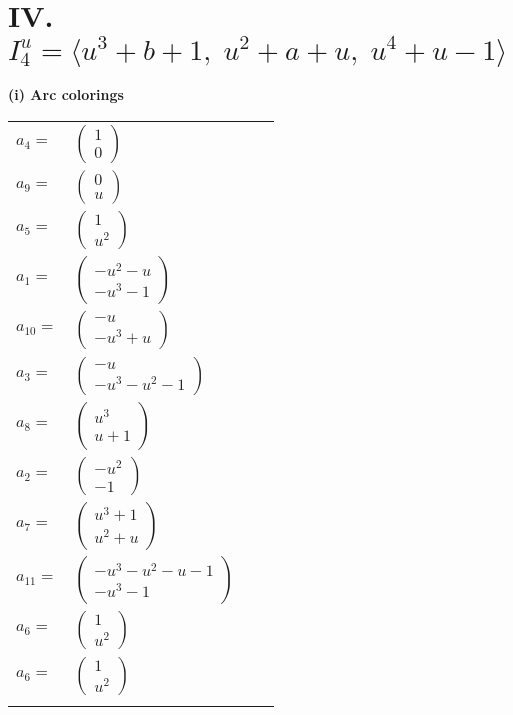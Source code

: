 \documentclass[1p]{elsarticle_modified}
\theoremstyle{definition}
\begin{document}
\centering \section*{IV. $I^u_{4}= \langle u^3+b+1,\;u^2+a+u,\;u^4+u-1 \rangle$}
\flushleft \textbf{(i) Arc colorings}\\
\begin{tabular}{m{7pt} m{180pt} m{7pt} m{180pt} }
\flushright $a_{4}=$&$\begin{pmatrix}1\\0\end{pmatrix}$ \\
\flushright $a_{9}=$&$\begin{pmatrix}0\\u\end{pmatrix}$ \\
\flushright $a_{5}=$&$\begin{pmatrix}1\\u^2\end{pmatrix}$ \\
\flushright $a_{1}=$&$\begin{pmatrix}- u^2- u\\- u^3-1\end{pmatrix}$ \\
\flushright $a_{10}=$&$\begin{pmatrix}- u\\- u^3+u\end{pmatrix}$ \\
\flushright $a_{3}=$&$\begin{pmatrix}- u\\- u^3- u^2-1\end{pmatrix}$ \\
\flushright $a_{8}=$&$\begin{pmatrix}u^3\\u+1\end{pmatrix}$ \\
\flushright $a_{2}=$&$\begin{pmatrix}- u^2\\-1\end{pmatrix}$ \\
\flushright $a_{7}=$&$\begin{pmatrix}u^3+1\\u^2+u\end{pmatrix}$ \\
\flushright $a_{11}=$&$\begin{pmatrix}- u^3- u^2- u-1\\- u^3-1\end{pmatrix}$ \\
\flushright $a_{6}=$&$\begin{pmatrix}1\\u^2\end{pmatrix}$\\ \flushright $a_{6}=$&$\begin{pmatrix}1\\u^2\end{pmatrix}$\\&\end{tabular}
\end{document}
